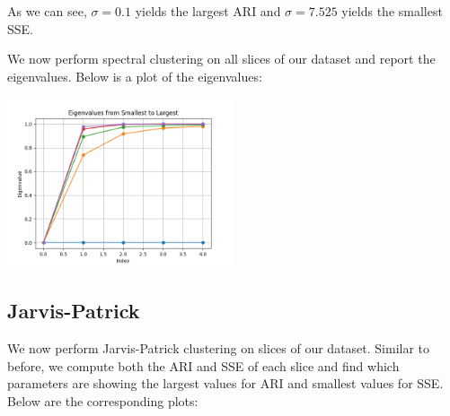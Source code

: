 \documentclass{article}
\begin{document}
As we can see, $\sigma=0.1$ yields the largest ARI and $\sigma=7.525$ yields the smallest SSE.

We now perform spectral clustering on all slices of our dataset and report the eigenvalues. Below is a plot of the eigenvalues:

\noindent
\begin{minipage}{\textwidth}
    \centering
    \includegraphics[width=0.5\textwidth]{Spectral_eig.png}
\end{minipage}%


\subsection*{Jarvis-Patrick}
We now perform Jarvis-Patrick clustering on slices of our dataset. Similar to before, we compute both the ARI and SSE of each slice and find which parameters are showing the largest values for ARI and smallest values for SSE. Below are the corresponding plots:
\end{document}
